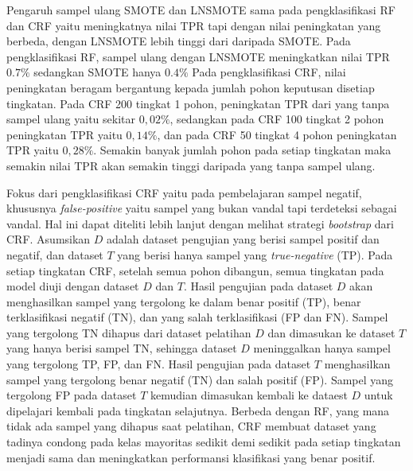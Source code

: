 Pengaruh sampel ulang SMOTE dan LNSMOTE sama pada pengklasifikasi RF dan
CRF yaitu meningkatnya nilai TPR tapi dengan nilai peningkatan yang berbeda,
dengan LNSMOTE lebih tinggi dari daripada SMOTE.
Pada pengklasifikasi RF, sampel ulang dengan LNSMOTE meningkatkan nilai TPR
$0.7\%$ sedangkan SMOTE hanya $0.4\%$
Pada pengklasifikasi CRF, nilai peningkatan beragam bergantung kepada jumlah
pohon keputusan disetiap tingkatan.
Pada CRF 200 tingkat 1 pohon, peningkatan TPR dari yang tanpa sampel ulang
yaitu sekitar $0,02\%$, sedangkan pada CRF 100 tingkat 2 pohon peningkatan TPR
yaitu $0,14\%$, dan pada CRF 50 tingkat 4 pohon peningkatan TPR yaitu $0,28\%$.
Semakin banyak jumlah pohon pada setiap tingkatan maka semakin nilai TPR akan
semakin tinggi daripada yang tanpa sampel ulang.




Fokus dari pengklasifikasi CRF yaitu pada pembelajaran sampel negatif,
khususnya \textit{false-positive} yaitu sampel yang bukan vandal tapi
terdeteksi sebagai vandal.
Hal ini dapat diteliti lebih lanjut dengan melihat strategi \textit{bootstrap}
dari CRF.
Asumsikan $D$ adalah dataset pengujian yang berisi sampel positif dan negatif,
dan dataset $T$ yang berisi hanya sampel yang \textit{true-negative} (TP).
Pada setiap tingkatan CRF, setelah semua pohon dibangun, semua tingkatan pada
model diuji dengan dataset $D$ dan $T$.
Hasil pengujian pada dataset $D$ akan menghasilkan sampel yang tergolong ke
dalam benar positif (TP), benar terklasifikasi negatif (TN), dan yang salah
terklasifikasi (FP dan FN).
Sampel yang tergolong TN dihapus dari dataset pelatihan $D$ dan dimasukan ke
dataset $T$ yang hanya berisi sampel TN, sehingga dataset $D$ meninggalkan
hanya sampel yang tergolong TP, FP, dan FN.
Hasil pengujian pada dataset $T$ menghasilkan sampel yang tergolong benar
negatif (TN) dan salah positif (FP).
Sampel yang tergolong FP pada dataset $T$ kemudian dimasukan kembali ke dataest
$D$ untuk dipelajari kembali pada tingkatan selajutnya.
Berbeda dengan RF, yang mana tidak ada sampel yang dihapus saat
pelatihan, CRF membuat dataset yang tadinya condong pada kelas mayoritas
sedikit demi sedikit pada setiap tingkatan menjadi sama dan meningkatkan
performansi klasifikasi yang benar positif.
